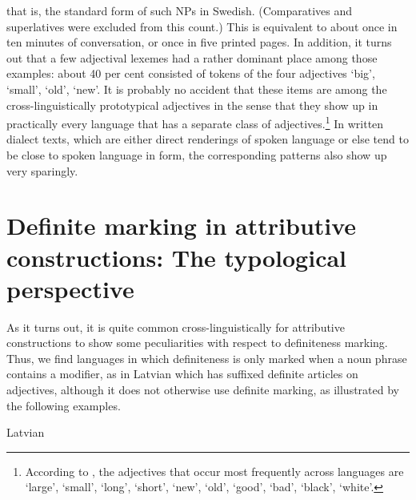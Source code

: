 
that is, the standard form of such NPs in Swedish. (Comparatives and superlatives were excluded from this count.) This is equivalent to about once in ten minutes of conversation, or once in five printed pages. In addition, it turns out that a few adjectival lexemes had a rather dominant place among those examples: about 40 per cent consisted of tokens of the four adjectives ‘big’,  ‘small’,  ‘old’,  ‘new’. It is probably no accident that these items are among the cross-linguistically prototypical adjectives in the sense that they show up in practically every language that has a separate class of adjectives.\footnote{\label{fnt:ftn36} According to \citet{Dixon1977}, the adjectives that occur most frequently across languages are ‘large’, ‘small’, ‘long’, ‘short’, ‘new’, ‘old’, ‘good’, ‘bad’, ‘black’, ‘white’.} In written dialect texts, which are either direct renderings of spoken language or else tend to be close to spoken language in form, the corresponding patterns also show up very sparingly.


\section{\rmfamily Definite marking in attributive constructions: The typological perspective}

As it turns out, it is quite common cross-linguistically for attributive constructions to show some peculiarities with respect to definiteness marking. Thus, we find languages in which definiteness is only marked when a noun phrase contains a modifier, as in Latvian which has suffixed definite articles on adjectives, although it does not otherwise use definite marking, as illustrated by the following examples. 


\item 

Latvian

